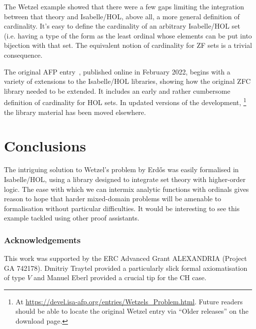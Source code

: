 \documentclass[runningheads]{llncs}
\begin{document}
The Wetzel example showed that there were a few gaps limiting the integration between that theory and Isabelle/HOL, above all, a more general definition of cardinality. It's easy to define the cardinality of an arbitrary Isabelle/HOL set (i.e. having a type of the form  as the least ordinal whose elements can be put into bijection with that set.
The equivalent notion of cardinality for ZF sets is a trivial consequence.

The original AFP entry~\cite{Wetzels_Problem-AFP}, published online in February 2022, begins with a variety of extensions to the Isabelle/HOL libraries, showing how the original ZFC library needed to be extended.
It includes an early and rather cumbersome definition of cardinality for HOL sets. In updated versions of the development,%
\footnote{At \url{https://devel.isa-afp.org/entries/Wetzels_Problem.html}. Future readers should be able to locate the original Wetzel entry via ``Older releases'' on the download page.}
%
the library material has been moved elsewhere.

\section{Conclusions}

The intriguing solution to Wetzel's problem by Erd\H{o}s was easily formalised in Isabelle/HOL, using a library designed to integrate set theory with higher-order logic.
The ease with which we can intermix analytic functions with ordinals gives reason to hope that harder mixed-domain problems will be amenable to formalisation without particular difficulties.
It would be interesting to see this example tackled using other proof assistants.

\subsubsection{Acknowledgements} 
This work was supported by the ERC Advanced Grant ALEXANDRIA (Project GA 742178). 
Dmitriy Traytel provided a particularly slick formal axiomatisation of type $V$ and Manuel Eberl provided a crucial tip for the CH case.



\end{document}

